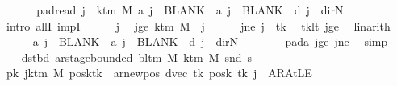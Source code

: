 \begin{isabellebody}
\isanewline
\ \ \isamarkupfalse%
\isanewline
\ \ \isamarkupfalse%
\ pad{\isacharunderscore}{\kern0pt}read{\isacharcolon}{\kern0pt}\ {\isachardoublequoteopen}{\isasymforall}j\ {\isasymge}\ k{\isacharunderscore}{\kern0pt}tm\ M{\isachardot}{\kern0pt}\ {\isacharquery}{\kern0pt}a\ j\ {\isacharequal}{\kern0pt}\ BLANK{}\ {\isasymand}\ {\isacharquery}{\kern0pt}a\ j\ {\isacharequal}{\kern0pt}\ BLANK{}\ {\isasymand}\ {\isacharquery}{\kern0pt}d\ j\ {\isacharequal}{\kern0pt}\ dir{\isachardot}{\kern0pt}N{\isachardoublequoteclose}\isanewline
\ \ \isamarkupfalse%
\ {\isacharparenleft}{\kern0pt}intro\ allI\ impI{\isacharparenright}{\kern0pt}\isanewline
\ \ \ \ \isamarkupfalse%
\ j\ \isamarkupfalse%
\ jge{\isacharcolon}{\kern0pt}\ {\isachardoublequoteopen}k{\isacharunderscore}{\kern0pt}tm\ M\ {\isasymle}\ j{\isachardoublequoteclose}\isanewline
\ \ \ \ \isamarkupfalse%
\ jne{\isacharcolon}{\kern0pt}\ {\isachardoublequoteopen}j\ {\isasymnoteq}\ tk{\isachardoublequoteclose}\ \isamarkupfalse%
\ tk{\isacharunderscore}{\kern0pt}lt\ jge\ \isamarkupfalse%
\ linarith\isanewline
\ \ \ \ \isamarkupfalse%
\ {\isachardoublequoteopen}{\isacharquery}{\kern0pt}a\ j\ {\isacharequal}{\kern0pt}\ BLANK{}\ {\isasymand}\ {\isacharquery}{\kern0pt}a\ j\ {\isacharequal}{\kern0pt}\ BLANK{}\ {\isasymand}\ {\isacharquery}{\kern0pt}d\ j\ {\isacharequal}{\kern0pt}\ dir{\isachardot}{\kern0pt}N{\isachardoublequoteclose}\isanewline
\ \ \ \ \ \ \isamarkupfalse%
\ pad{\isacharunderscore}{\kern0pt}a\ jge\ jne\ \isamarkupfalse%
\ simp\isanewline
\ \ \isamarkupfalse%
\isanewline
\ \ \isamarkupfalse%
\ dst{\isacharunderscore}{\kern0pt}bd{\isacharcolon}{\kern0pt}\ {\isachardoublequoteopen}ar{\isacharunderscore}{\kern0pt}stage{\isacharunderscore}{\kern0pt}bounded\ {\isacharparenleft}{\kern0pt}bl{\isacharunderscore}{\kern0pt}tm\ M{\isacharparenright}{\kern0pt}\ {\isacharparenleft}{\kern0pt}k{\isacharunderscore}{\kern0pt}tm\ M{\isacharparenright}{\kern0pt}\ {\isacharparenleft}{\kern0pt}snd\ {\isacharquery}{\kern0pt}s{\isacharprime}{\kern0pt}{\isacharparenright}{\kern0pt}{\isachardoublequoteclose}\isanewline
\ \ \isamarkupfalse%
\ {\isacharminus}{\kern0pt}\isanewline
\ \ \ \ \isamarkupfalse%
\ pk{\isacharcolon}{\kern0pt}\ {\isachardoublequoteopen}{\isasymforall}j{\isasymge}k{\isacharunderscore}{\kern0pt}tm\ M{\isachardot}{\kern0pt}\ {\isacharparenleft}{\kern0pt}posk{\isacharparenleft}{\kern0pt}tk\ {\isacharcolon}{\kern0pt}{\isacharequal}{\kern0pt}\ ar{\isacharunderscore}{\kern0pt}newpos\ {\isacharparenleft}{\kern0pt}dvec\ tk{\isacharparenright}{\kern0pt}\ {\isacharparenleft}{\kern0pt}posk\ tk{\isacharparenright}{\kern0pt}{\isacharparenright}{\kern0pt}{\isacharparenright}{\kern0pt}\ j\ {\isacharequal}{\kern0pt}\ AR{\isacharunderscore}{\kern0pt}AtLE{\isachardoublequoteclose}\isanewline

\end{isabellebody}
